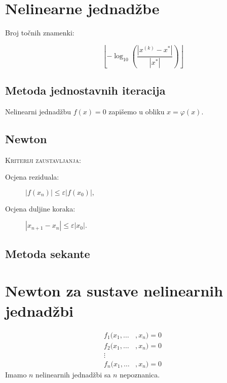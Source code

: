 \documentclass{article}
\begin{document}
\section{Nelinearne jednadžbe}
\begin{description}
  \item[Broj točnih znamenki:] $$\left\lfloor -\log_{10} \left ( \frac{|x^{(k)} - x^\ast |}{|x^\ast|}\right ) \right \rfloor$$
\end{description}

\subsection{Metoda jednostavnih iteracija}
Nelinearni jednadžbu $f(x) = 0$ zapišemo u obliku $x = \varphi (x)$.
\begin{algorithmic}
\EndWhile
\end{algorithmic}


\subsection{Newton}
\begin{algorithmic}
 
\EndWhile
\end{algorithmic}
\textsc{Kriteriji zaustavljanja:}
\begin{description}
  \item[Ocjena reziduala:] $|f(x_n)| \leq \varepsilon |f(x_0)|,$
  \item[Ocjena duljine koraka:] $|x_{n+1}-x_n| \leq \varepsilon |x_0|.$
\end{description}

\subsection{Metoda sekante}
\begin{algorithmic}
\EndWhile
\end{algorithmic}

\section{Newton za sustave nelinearnih jednadžbi}
\begin{align*}
f_1(x_1, \ldots&, x_n) = 0 \\
f_2(x_1, \ldots&, x_n) = 0 \\
\vdots&\\
f_n(x_1, \ldots&, x_n) = 0
\end{align*}
Imamo $n$ nelinearnih jednadžbi sa $n$ nepoznanica.
\end{document}
